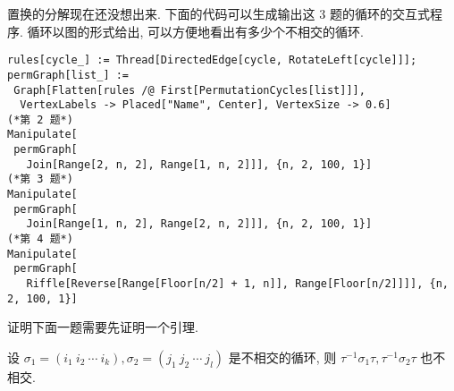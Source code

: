 \documentclass[color=black,device=normal,lang=cn,mode=geye]{elegantnote}
\begin{document}
\begin{solution}
    置换的分解现在还没想出来. 下面的代码可以生成输出这 3 题的循环的交互式程序. 循环以图的形式给出, 可以方便地看出有多少个不相交的循环.
\begin{lstlisting}
rules[cycle_] := Thread[DirectedEdge[cycle, RotateLeft[cycle]]];
permGraph[list_] := 
 Graph[Flatten[rules /@ First[PermutationCycles[list]]], 
  VertexLabels -> Placed["Name", Center], VertexSize -> 0.6]
(*第 2 题*)
Manipulate[
 permGraph[
   Join[Range[2, n, 2], Range[1, n, 2]]], {n, 2, 100, 1}]
(*第 3 题*)
Manipulate[
 permGraph[
   Join[Range[1, n, 2], Range[2, n, 2]]], {n, 2, 100, 1}]
(*第 4 题*)
Manipulate[
 permGraph[
   Riffle[Reverse[Range[Floor[n/2] + 1, n]], Range[Floor[n/2]]]], {n, 2, 100, 1}]
\end{lstlisting}
\end{solution}

证明下面一题需要先证明一个引理.
\begin{lemma}\label{l2.1}
    设 $\sigma_1=(i_1\ i_2\ \cdots\ i_k),\sigma_2=(j_1\ j_2\ \cdots\ j_l)$ 是不相交的循环, 则 $\tau^{-1}\sigma_1\tau,\tau^{-1}\sigma_2\tau$ 也不相交.
\end{lemma}
\end{document}
